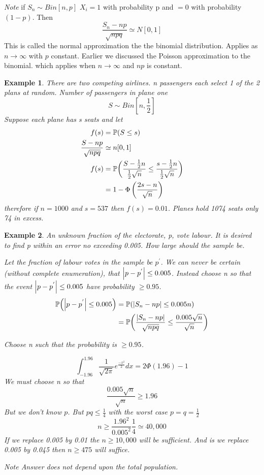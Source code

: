 \documentclass{notes}
\theoremstyle{plain}
\newtheorem*{example}{Example}
\newcommand{\bP}{\mathbb{P}}
\newcommand{\prob}[1]{\bP \negthinspace\left(#1\right)}
\begin{document}
\emph{Note} if $S_n \sim Bin[n,p]$ $X_i = 1$ with probability p and
$=0$ with probability $(1-p)$. Then
\[
\frac{S_n - np}{\sqrt{npq}} \simeq N[0,1]
\]
This is called the normal approximation the the binomial
distribution. Applies as $n \to \infty$ with $p$ constant. Earlier we
discussed the Poisson approximation to the binomial. which applies when
$n \to \infty$ and $np$ is constant.

\begin{example}
There are two competing airlines. n passengers each select 1 of the 2
plans at random. Number of passengers in plane one
\[
S\sim Bin[n,\frac{1}{2}]
\]
Suppose each plane has s seats and let
\begin{align*}
f(s) &= \prob{S\le s}\\
\frac{S-np}{\sqrt{npq}} &\simeq n[0,1]\\
f(s) &= \prob{\frac{S - \frac{1}{2}n}{\frac{1}{2}\sqrt{n}}
 \le \frac{s - \frac{1}{2}n}{\frac{1}{2}\sqrt{n}}}\\
&= 1 - \Phi\left( \frac{2s - n}{\sqrt{n}}\right)
\end{align*}
therefore if $n=1000$ and $s=537$ then $f(s) = 0.01$. Planes hold 1074
seats only 74 in excess.
\end{example}

\begin{example}
An unknown fraction of the electorate, p, vote labour.  It is desired to
find p within an error no exceeding 0.005. How large should the sample
be.

Let the fraction of labour votes in the sample be $p^{'}$.  We can
never be certain (without complete enumeration), that $\left|p - p^{'}\right|
\le 0.005$. Instead choose n so that the event  $\left|p - p^{'}\right|
\le 0.005$ have probability $\ge 0.95$.
\begin{align*}
\prob{\abs{p - p^{'}} \le 0.005} &= \prob{\abs{S_n - np} \le 0.005n}\\
&= \prob{\frac{\abs{S_n - np}}{\sqrt{npq}} \le\frac
  { 0.005\sqrt{n}}{\sqrt{n}}}\\
\end{align*}

Choose n such that the probability is  $\ge 0.95$.

\vspace{2in}

\[
\int_{-1.96}^{1.96} \frac{1}{\sqrt{2\pi}} e^{\frac{-x^2}{2}}dx =
  2\Phi(1.96) - 1 
\]
We must choose n so that 
\[
\frac{ 0.005\sqrt{n}}{\sqrt{n}} \ge 1.96
\]
But we don't know $p$. But $pq\leq \frac{1}{4}$ with the worst case
$p=q=\frac{1}{2}$ 
\[
n \geq \frac{1.96^2}{0.005^2}\frac{1}{4} \simeq 40,000
\]
If we replace 0.005 by 0.01 the $n \ge 10,000$ will be sufficient. And
is we replace 0.005 by 0.045 then $n\ge 475$ will suffice.

\emph{Note} Answer does not depend upon the total population.
\end{example}
\end{document}
